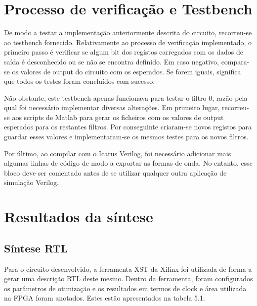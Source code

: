 \documentclass[10pt,twoside]{article}
\begin{document}
\section{Processo de verificação e Testbench}
De modo a testar a implementação anteriormente descrita do circuito, recorreu-se ao testbench fornecido. Relativamente ao processo de verificação implementado, o primeiro passo é verificar se algum bit dos registos carregados com os dados de saída é desconhecido ou se não se encontra definido. Em caso negativo, compara-se os valores de output do circuito com os esperados. Se forem iguais, significa que todos os testes foram concluídos com sucesso.

Não obstante, este testbench apenas funcionava para testar o filtro 0, razão pela qual foi necessário implementar diversas alterações. Em primeiro lugar, recorreu-se aos scripts de Matlab para gerar os ficheiros com os valores de output esperados para os restantes filtros.  Por conseguinte criaram-se novos registos para guardar esses valores e implementaram-se os mesmos testes para os novos filtros.

Por último, ao compilar com o Icarus Verilog, foi necessário adicionar mais algumas linhas de código de modo a exportar as formas de onda. No entanto, esse bloco deve ser comentado antes de se utilizar qualquer outra aplicação de simulação Verilog.


\section{Resultados da síntese}
\subsection{Síntese RTL}
Para o circuito desenvolvido, a ferramenta XST da Xilinx foi utilizada de forma a gerar uma descrição RTL deste mesmo. Dentro da ferramenta, foram configurados os parâmetros de otimização e os resultados em termos de clock e área utilizada na FPGA foram anotados. Estes estão apresentados na tabela 5.1.
\end{document}
